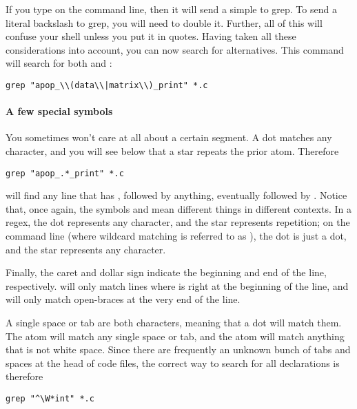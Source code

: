 If you type \ci{$\backslash$|} on the command line, then it will send a
simple \ci{|} to grep. To send a literal backslash to grep, you will
need to double it. Further, all of this will confuse your shell unless
you put it in quotes. Having taken all these considerations into
account, you can now search for alternatives. This command will search
for both  and :
\begin{lstlisting}
grep "apop_\\(data\\|matrix\\)_print" *.c
\end{lstlisting}

\paragraph{A few special symbols}
You sometimes won't care at all about a certain segment. A 
dot matches any character, and you will see below that a star 
repeats the prior atom. Therefore
\begin{lstlisting}
grep "apop_.*_print" *.c
\end{lstlisting}
will find any line that has , followed by anything,
eventually followed by . Notice that, once again, the
symbols  and \ci{*} mean different things in different contexts.
In a regex, the dot represents any character, and the star represents
repetition; on the command line (where wildcard matching is referred to
as ), the dot is just a dot, and the star represents any
character.

Finally, the caret and dollar sign indicate the beginning and end of the
line, respectively.   will only match
lines where  is right at the beginning of the line, and 
 will only match open-braces at the very end of the
line. 

A single space or tab are both characters, meaning that a dot will
match them. The atom  will match any single space or tab,
and the atom  will match anything that is not white space.
Since there are frequently an unknown bunch of tabs and spaces at the
head of code files, the correct way to search for all 
declarations is therefore
\begin{lstlisting}
grep "^\W*int" *.c
\end{lstlisting}

